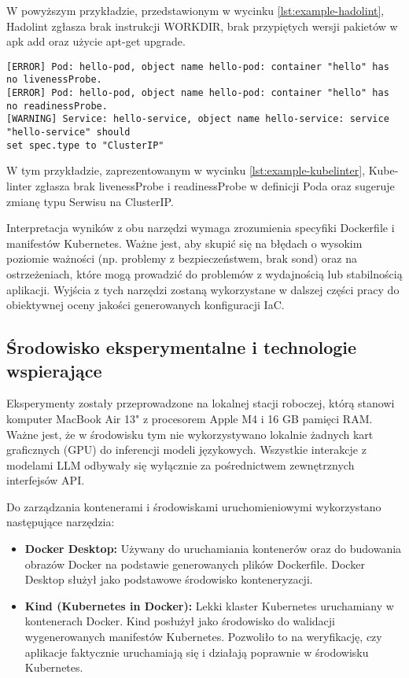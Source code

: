 W powyższym przykładzie, przedstawionym w wycinku \ref{lst:example-hadolint}, Hadolint zgłasza brak instrukcji WORKDIR, brak przypiętych wersji pakietów w apk add oraz użycie apt-get upgrade.

\begin{lstlisting}[caption={Przykład wyników Kube-linter},label={lst:example-kubelinter},captionpos=b,columns=fullflexible, breaklines=true]
[ERROR] Pod: hello-pod, object name hello-pod: container "hello" has no livenessProbe.
[ERROR] Pod: hello-pod, object name hello-pod: container "hello" has no readinessProbe.
[WARNING] Service: hello-service, object name hello-service: service "hello-service" should
set spec.type to "ClusterIP"
\end{lstlisting}

W tym przykładzie, zaprezentowanym w wycinku \ref{lst:example-kubelinter}, Kube-linter zgłasza brak livenessProbe i readinessProbe w definicji Poda oraz sugeruje zmianę typu Serwisu na ClusterIP.

Interpretacja wyników z obu narzędzi wymaga zrozumienia specyfiki Dockerfile i manifestów Kubernetes. Ważne jest, aby skupić się na błędach o wysokim poziomie ważności (np. problemy z bezpieczeństwem, brak sond) oraz na ostrzeżeniach, które mogą prowadzić do problemów z wydajnością lub stabilnością aplikacji. Wyjścia z tych narzędzi zostaną wykorzystane w dalszej części pracy do obiektywnej oceny jakości generowanych konfiguracji IaC.

\subsection{Środowisko eksperymentalne i technologie wspierające}

Eksperymenty zostały przeprowadzone na lokalnej stacji roboczej, którą stanowi komputer MacBook Air 13" z procesorem Apple M4 i 16 GB pamięci RAM. Ważne jest, że w środowisku tym nie wykorzystywano lokalnie żadnych kart graficznych (GPU) do inferencji modeli językowych. Wszystkie interakcje z modelami LLM odbywały się wyłącznie za pośrednictwem zewnętrznych interfejsów API.

Do zarządzania kontenerami i środowiskami uruchomieniowymi wykorzystano następujące narzędzia:
\begin{itemize}
	\item \textbf{Docker Desktop:} Używany do uruchamiania kontenerów oraz do budowania obrazów Docker na podstawie generowanych plików Dockerfile. Docker Desktop służył jako podstawowe środowisko konteneryzacji.
	\item \textbf{Kind (Kubernetes in Docker):} Lekki klaster Kubernetes uruchamiany w kontenerach Docker. Kind posłużył jako środowisko do walidacji wygenerowanych manifestów Kubernetes. Pozwoliło to na weryfikację, czy aplikacje faktycznie uruchamiają się i działają poprawnie w środowisku Kubernetes.
\end{itemize}

